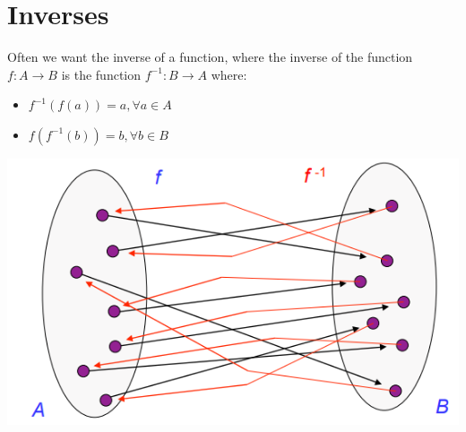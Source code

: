 \documentclass{article}[18pt]
\begin{document}
\section{Inverses}
Often we want the inverse of a function, where the inverse of the function $f: A\rightarrow B$ is the function $f^{-1}: B\rightarrow A$ where:
\begin{itemize}
	\item $f ^ { - 1 } ( f ( a ) ) = a , \forall a \in A$
	\item $f \left( f ^ { - 1 } ( b ) \right) = b , \forall b \in B$
\end{itemize}
\begin{center}
	\includegraphics[scale=0.7]{inverse}
\end{center}
\end{document}
